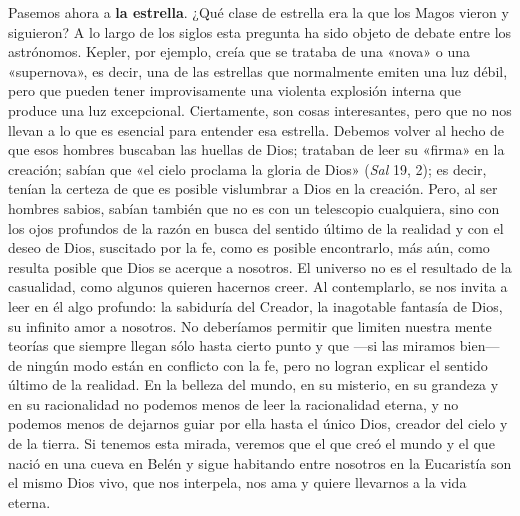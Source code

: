\documentclass[]{article}
\begin{document}
Pasemos ahora a \textbf{la estrella}. ¿Qué clase de estrella era la que
los Magos vieron y siguieron? A lo largo de los siglos esta pregunta ha
sido objeto de debate entre los astrónomos. Kepler, por ejemplo, creía
que se trataba de una «nova» o una «supernova», es decir, una de las
estrellas que normalmente emiten una luz débil, pero que pueden tener
improvisamente una violenta explosión interna que produce una luz
excepcional. Ciertamente, son cosas interesantes, pero que no nos llevan
a lo que es esencial para entender esa estrella. Debemos volver al hecho
de que esos hombres buscaban las huellas de Dios; trataban de leer su
«firma» en la creación; sabían que «el cielo proclama la gloria de Dios»
(\emph{Sal} 19, 2); es decir, tenían la certeza de que es posible
vislumbrar a Dios en la creación. Pero, al ser hombres sabios, sabían
también que no es con un telescopio cualquiera, sino con los ojos
profundos de la razón en busca del sentido último de la realidad y con
el deseo de Dios, suscitado por la fe, como es posible encontrarlo, más
aún, como resulta posible que Dios se acerque a nosotros. El universo no
es el resultado de la casualidad, como algunos quieren hacernos creer.
Al contemplarlo, se nos invita a leer en él algo profundo: la sabiduría
del Creador, la inagotable fantasía de Dios, su infinito amor a
nosotros. No deberíamos permitir que limiten nuestra mente teorías que
siempre llegan sólo hasta cierto punto y que ---si las miramos bien---
de ningún modo están en conflicto con la fe, pero no logran explicar el
sentido último de la realidad. En la belleza del mundo, en su misterio,
en su grandeza y en su racionalidad no podemos menos de leer la
racionalidad eterna, y no podemos menos de dejarnos guiar por ella hasta
el único Dios, creador del cielo y de la tierra. Si tenemos esta mirada,
veremos que el que creó el mundo y el que nació en una cueva en Belén y
sigue habitando entre nosotros en la Eucaristía son el mismo Dios vivo,
que nos interpela, nos ama y quiere llevarnos a la vida eterna.
\end{document}
